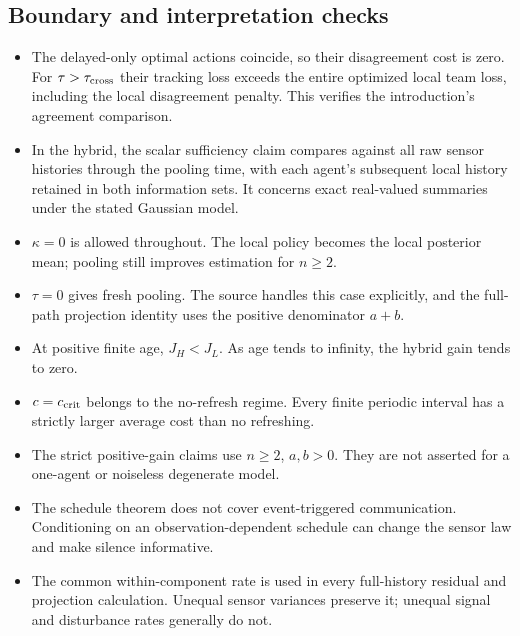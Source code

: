 \documentclass[11pt,letterpaper]{article}
\begin{document}
\subsection{Boundary and interpretation checks}
\begin{itemize}
\item The delayed-only optimal actions coincide, so their disagreement cost is zero. For $\tau>\tau_{\rm cross}$ their tracking loss exceeds the entire optimized local team loss, including the local disagreement penalty. This verifies the introduction's agreement comparison.
\item In the hybrid, the scalar sufficiency claim compares against all raw sensor histories through the pooling time, with each agent's subsequent local history retained in both information sets. It concerns exact real-valued summaries under the stated Gaussian model.
\item $\kappa=0$ is allowed throughout. The local policy becomes the local posterior mean; pooling still improves estimation for $n\ge2$.
\item $\tau=0$ gives fresh pooling. The source handles this case explicitly, and the full-path projection identity uses the positive denominator $a+b$.
\item At positive finite age, $J_H<J_L$. As age tends to infinity, the hybrid gain tends to zero.
\item $c=c_{\rm crit}$ belongs to the no-refresh regime. Every finite periodic interval has a strictly larger average cost than no refreshing.
\item The strict positive-gain claims use $n\ge2$, $a,b>0$. They are not asserted for a one-agent or noiseless degenerate model.
\item The schedule theorem does not cover event-triggered communication. Conditioning on an observation-dependent schedule can change the sensor law and make silence informative.
\item The common within-component rate is used in every full-history residual and projection calculation. Unequal sensor variances preserve it; unequal signal and disturbance rates generally do not.
\end{itemize}
\end{document}
